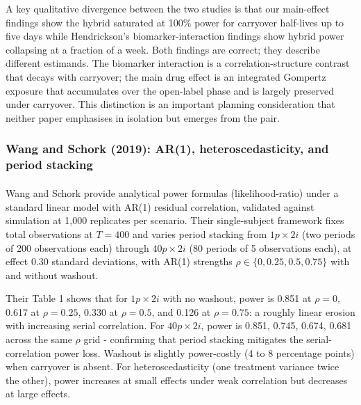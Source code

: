 \documentclass[
  11pt,
]{article}
\begin{document}
A key qualitative divergence between the two studies is that our
main-effect findings show the hybrid saturated at 100\% power for
carryover half-lives up to five days while Hendrickson's
biomarker-interaction findings show hybrid power collapsing at a
fraction of a week. Both findings are correct; they describe different
estimands. The biomarker interaction is a correlation-structure contrast
that decays with carryover; the main drug effect is an integrated
Gompertz exposure that accumulates over the open-label phase and is
largely preserved under carryover. This distinction is an important
planning consideration that neither paper emphasises in isolation but
emerges from the pair.

\subsubsection{Wang and Schork (2019): AR(1), heteroscedasticity, and
period
stacking}\label{wang-and-schork-2019-ar1-heteroscedasticity-and-period-stacking}

Wang and
Schork\textsuperscript{}
provide analytical power formulas (likelihood-ratio) under a standard
linear model with AR(1) residual correlation, validated against
simulation at 1,000 replicates per scenario. Their single-subject
framework fixes total observations at \(T = 400\) and varies period
stacking from \(1p \times 2i\) (two periods of 200 observations each)
through \(40p \times 2i\) (80 periods of 5 observations each), at effect
0.30 standard deviations, with AR(1) strengths
\(\rho \in \{0, 0.25, 0.5, 0.75\}\) with and without washout.

Their Table 1 shows that for \(1p \times 2i\) with no washout, power is
0.851 at \(\rho = 0\), 0.617 at \(\rho = 0.25\), 0.330 at
\(\rho = 0.5\), and 0.126 at \(\rho = 0.75\): a roughly linear erosion
with increasing serial correlation. For \(40p \times 2i\), power is
0.851, 0.745, 0.674, 0.681 across the same \(\rho\) grid - confirming
that period stacking mitigates the serial-correlation power loss.
Washout is slightly power-costly (4 to 8 percentage points) when
carryover is absent. For heteroscedasticity (one treatment variance
twice the other), power increases at small effects under weak
correlation but decreases at large effects.
\end{document}
